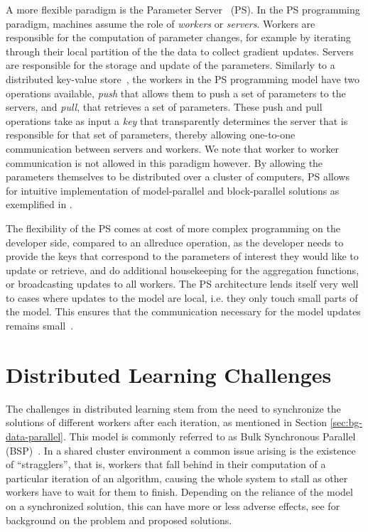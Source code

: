A more flexible paradigm is the Parameter Server~\cite{muPS, ps-osdi} (PS). In the PS programming
paradigm, machines assume the role of \emph{workers} or \emph{servers}. Workers are
responsible for the computation of parameter changes, for example by iterating through
their local partition of the the data to collect gradient updates. Servers are responsible
for the storage and update of the parameters.
Similarly to a distributed key-value store~\cite{dynamo}, the workers in the PS programming
model have two operations available, \emph{push} that allows them to push a set of
parameters to the servers, and \emph{pull}, that retrieves a set of parameters.
These push and pull operations take as input a \emph{key} that transparently determines
the server that is responsible for that set of parameters, thereby allowing
one-to-one communication between servers and workers. We note that worker to
worker communication is not allowed in this paradigm however.
By allowing the parameters themselves to be
distributed over a cluster of computers, PS allows for intuitive implementation of
model-parallel and block-parallel solutions as exemplified in \cite{muPS, lightLDA}.

The flexibility of the PS comes at cost of more complex programming on the developer
side, compared to an allreduce operation, as the developer needs to provide the
keys that correspond to the parameters of interest they would like to update or
retrieve, and do additional housekeeping for the aggregation functions, or broadcasting
updates to all workers. The PS architecture lends itself very well to cases where updates to the model
are local, i.e. they only touch small parts of the model. This ensures that the communication
necessary for the model updates remains small~\cite{muPS}.

\section{Distributed Learning Challenges}
\label{sec:bg-ml-challenges}

The challenges in distributed learning stem from the need to synchronize the solutions of different workers
after each iteration,
as mentioned in Section \ref{sec:bg-data-parallel}. This model is commonly referred to as
Bulk Synchronous Parallel (BSP)~\cite{stale-sync-ps}.
In a shared cluster environment a common issue arising is the existence of ``stragglers'', that is,
workers that fall behind in their computation of a particular iteration of an algorithm, causing
the whole system to stall as other workers have to wait for them to finish. Depending on the reliance
of the model on a synchronized solution, this can have more or less adverse effects, see
\cite{straggler-ml} for background on the problem and proposed solutions.

